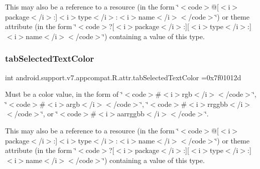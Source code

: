 This may also be a reference to a resource (in the form \char`\"{}$<$code$>$@\mbox{[}$<$i$>$package$<$/i$>$\+:\mbox{]}$<$i$>$type$<$/i$>$\+:$<$i$>$name$<$/i$>$$<$/code$>$\char`\"{}) or theme attribute (in the form \char`\"{}$<$code$>$?\mbox{[}$<$i$>$package$<$/i$>$\+:\mbox{]}\mbox{[}$<$i$>$type$<$/i$>$\+:\mbox{]}$<$i$>$name$<$/i$>$$<$/code$>$\char`\"{}) containing a value of this type. \mbox{\label{classandroid_1_1support_1_1v7_1_1appcompat_1_1R_1_1attr_aea27d1caa0bd5fcc2e45b2879ed95361}} 
\subsubsection{\texorpdfstring{tab\+Selected\+Text\+Color}{tabSelectedTextColor}}
{\footnotesize\ttfamily int android.\+support.\+v7.\+appcompat.\+R.\+attr.\+tab\+Selected\+Text\+Color =0x7f01012d\hspace{0.3cm}{\ttfamily [static]}}

Must be a color value, in the form of \char`\"{}$<$code$>$\#$<$i$>$rgb$<$/i$>$$<$/code$>$\char`\"{}, \char`\"{}$<$code$>$\#$<$i$>$argb$<$/i$>$$<$/code$>$\char`\"{}, \char`\"{}$<$code$>$\#$<$i$>$rrggbb$<$/i$>$$<$/code$>$\char`\"{}, or \char`\"{}$<$code$>$\#$<$i$>$aarrggbb$<$/i$>$$<$/code$>$\char`\"{}. 

This may also be a reference to a resource (in the form \char`\"{}$<$code$>$@\mbox{[}$<$i$>$package$<$/i$>$\+:\mbox{]}$<$i$>$type$<$/i$>$\+:$<$i$>$name$<$/i$>$$<$/code$>$\char`\"{}) or theme attribute (in the form \char`\"{}$<$code$>$?\mbox{[}$<$i$>$package$<$/i$>$\+:\mbox{]}\mbox{[}$<$i$>$type$<$/i$>$\+:\mbox{]}$<$i$>$name$<$/i$>$$<$/code$>$\char`\"{}) containing a value of this type. \mbox{\label{classandroid_1_1support_1_1v7_1_1appcompat_1_1R_1_1attr_ade27c2db1b2e6562fc6b3db5270492de}} 

